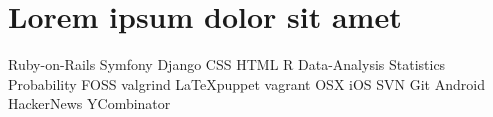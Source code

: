 \documentclass[11pt,a4paper,sans]{moderncv}        %
\begin{document}
\section{Lorem ipsum dolor sit amet}
 {Ruby-on-Rails Symfony Django CSS HTML R Data-Analysis Statistics Probability FOSS valgrind \LaTeX puppet vagrant OSX iOS SVN Git Android HackerNews YCombinator}



\end{document}
